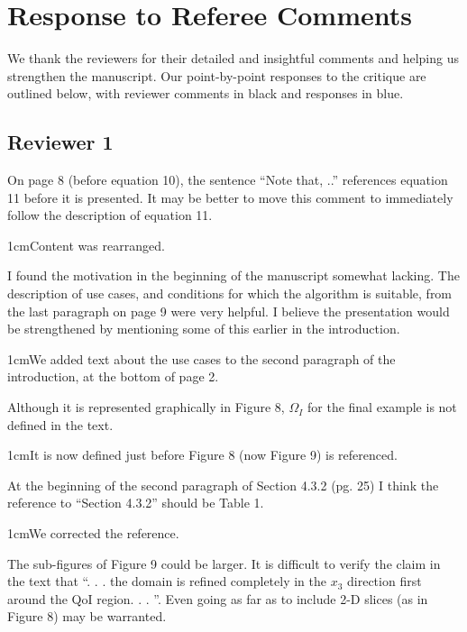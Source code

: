 \documentclass[12pt, letterpaper]{article}
\newcommand{\answer}[1]{\begin{adjustwidth}{1cm}{}{\color{blue}#1}\end{adjustwidth}}
\newcommand{\blue}[1]{{\color{blue}#1}}
\begin{document}

\section*{Response to Referee Comments}

We thank the reviewers for their detailed and insightful comments and helping us strengthen the manuscript. Our point-by-point responses to the critique are outlined below, with reviewer comments in black and \blue{responses in blue}. 



\subsection*{Reviewer 1}

On page 8 (before equation 10), the sentence “Note that, ..” references equation 11 before it is
presented. It may be better to move this comment to immediately follow the description of equation
11.

\answer{Content was rearranged.}

I found the motivation in the beginning of the manuscript somewhat lacking. The description of use
cases, and conditions for which the algorithm is suitable, from the last paragraph on page 9 were very
helpful. I believe the presentation would be strengthened by mentioning some of this earlier in the
introduction.

\answer{We added text about the use cases to the second paragraph of the introduction, at the bottom of page 2.}

Although it is represented graphically in Figure 8, $\Omega_I$ for the final example is not defined in the text.

\answer{It is now defined just before Figure 8 (now Figure 9) is referenced.}

At the beginning of the second paragraph of Section 4.3.2 (pg. 25) I think the reference to “Section
4.3.2” should be Table 1.

\answer{We corrected the reference.}

The sub-figures of Figure 9 could be larger. It is difficult to verify the claim in the text that “. . . the
domain is refined completely in the $x_3$ direction first around the QoI region. . . ”. Even going as far as
to include 2-D slices (as in Figure 8) may be warranted.
\end{document}

